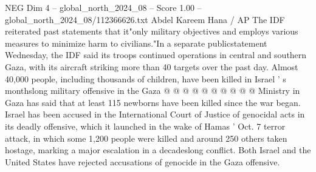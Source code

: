 \begin{textsample}{NEG Dim 4 – global\_north\_2024\_08 – Score 1.00 – global\_north\_2024\_08/112366626.txt}
Abdel Kareem Hana / AP The IDF reiterated past statements that it"only military objectives and employs various measures to minimize harm to civilians."In a separate publicstatement Wednesday, the IDF said its troops continued operations in central and southern Gaza, with its aircraft striking more than 40 targets over the past day.
Almost 40,000 people, including thousands of children, have been killed in Israel ' s monthslong military offensive in the Gaza @ @ @ @ @ @ @ @ @ @ Ministry in Gaza has said that at least 115 newborns have been killed since the war began.
Israel has been accused in the International Court of Justice of genocidal acts in its deadly offensive, which it launched in the wake of Hamas ' Oct. 7 terror attack, in which some 1,200 people were killed and around 250 others taken hostage, marking a major escalation in a decadeslong conflict.
Both Israel and the United States have rejected accusations of genocide in the Gaza offensive.

\end{textsample}
